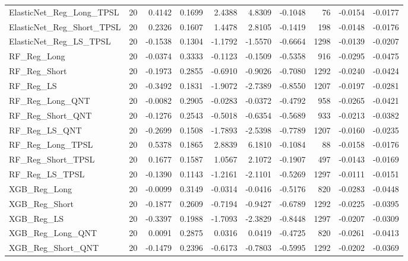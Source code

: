 \begin{tabular}{llrrrrrrrr}
\cline{1-10}
ElasticNet\_Reg\_Long\_TPSL & 20 & 0.4142 & 0.1699 & 2.4388 & 4.8309 & -0.1048 & 76 & -0.0154 & -0.0177 \\
\cline{1-10}
ElasticNet\_Reg\_Short\_TPSL & 20 & 0.2326 & 0.1607 & 1.4478 & 2.8105 & -0.1419 & 198 & -0.0148 & -0.0176 \\
\cline{1-10}
ElasticNet\_Reg\_LS\_TPSL & 20 & -0.1538 & 0.1304 & -1.1792 & -1.5570 & -0.6664 & 1298 & -0.0139 & -0.0207 \\
\cline{1-10}
RF\_Reg\_Long & 20 & -0.0374 & 0.3333 & -0.1123 & -0.1509 & -0.5358 & 916 & -0.0295 & -0.0475 \\
\cline{1-10}
RF\_Reg\_Short & 20 & -0.1973 & 0.2855 & -0.6910 & -0.9026 & -0.7080 & 1292 & -0.0240 & -0.0424 \\
\cline{1-10}
RF\_Reg\_LS & 20 & -0.3492 & 0.1831 & -1.9072 & -2.7389 & -0.8550 & 1207 & -0.0197 & -0.0281 \\
\cline{1-10}
RF\_Reg\_Long\_QNT & 20 & -0.0082 & 0.2905 & -0.0283 & -0.0372 & -0.4792 & 958 & -0.0265 & -0.0421 \\
\cline{1-10}
RF\_Reg\_Short\_QNT & 20 & -0.1276 & 0.2543 & -0.5018 & -0.6354 & -0.5689 & 933 & -0.0213 & -0.0382 \\
\cline{1-10}
RF\_Reg\_LS\_QNT & 20 & -0.2699 & 0.1508 & -1.7893 & -2.5398 & -0.7789 & 1207 & -0.0160 & -0.0235 \\
\cline{1-10}
RF\_Reg\_Long\_TPSL & 20 & 0.5378 & 0.1865 & 2.8839 & 6.1810 & -0.1084 & 88 & -0.0158 & -0.0176 \\
\cline{1-10}
RF\_Reg\_Short\_TPSL & 20 & 0.1677 & 0.1587 & 1.0567 & 2.1072 & -0.1907 & 497 & -0.0143 & -0.0169 \\
\cline{1-10}
RF\_Reg\_LS\_TPSL & 20 & -0.1390 & 0.1143 & -1.2161 & -2.1101 & -0.5269 & 1297 & -0.0111 & -0.0151 \\
\cline{1-10}
XGB\_Reg\_Long & 20 & -0.0099 & 0.3149 & -0.0314 & -0.0416 & -0.5176 & 820 & -0.0283 & -0.0448 \\
\cline{1-10}
XGB\_Reg\_Short & 20 & -0.1877 & 0.2609 & -0.7194 & -0.9427 & -0.6789 & 1292 & -0.0225 & -0.0395 \\
\cline{1-10}
XGB\_Reg\_LS & 20 & -0.3397 & 0.1988 & -1.7093 & -2.3829 & -0.8448 & 1297 & -0.0207 & -0.0309 \\
\cline{1-10}
XGB\_Reg\_Long\_QNT & 20 & 0.0091 & 0.2875 & 0.0316 & 0.0419 & -0.4725 & 820 & -0.0261 & -0.0413 \\
\cline{1-10}
XGB\_Reg\_Short\_QNT & 20 & -0.1479 & 0.2396 & -0.6173 & -0.7803 & -0.5995 & 1292 & -0.0202 & -0.0369 \\

\end{tabular}
